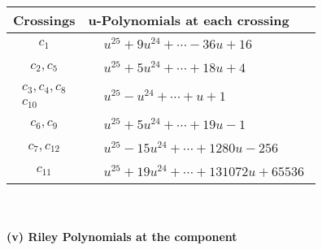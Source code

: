 \documentclass[1p]{elsarticle_modified}
\theoremstyle{definition}
\begin{document}
\begin{tabular}{m{50pt}|m{274pt}}
Crossings & \hspace{64pt}u-Polynomials at each crossing \\
\hline $$\begin{aligned}c_{1}\end{aligned}$$&$\begin{aligned}
&u^{25}+9 u^{24}+\cdots-36 u+16
\end{aligned}$\\
\hline $$\begin{aligned}c_{2},c_{5}\end{aligned}$$&$\begin{aligned}
&u^{25}+5 u^{24}+\cdots+18 u+4
\end{aligned}$\\
\hline $$\begin{aligned}c_{3},c_{4},c_{8}\\c_{10}\end{aligned}$$&$\begin{aligned}
&u^{25}- u^{24}+\cdots+u+1
\end{aligned}$\\
\hline $$\begin{aligned}c_{6},c_{9}\end{aligned}$$&$\begin{aligned}
&u^{25}+5 u^{24}+\cdots+19 u-1
\end{aligned}$\\
\hline $$\begin{aligned}c_{7},c_{12}\end{aligned}$$&$\begin{aligned}
&u^{25}-15 u^{24}+\cdots+1280 u-256
\end{aligned}$\\
\hline $$\begin{aligned}c_{11}\end{aligned}$$&$\begin{aligned}
&u^{25}+19 u^{24}+\cdots+131072 u+65536
\end{aligned}$\\
\hline
\end{tabular}\\~\\
\newpage\renewcommand{\arraystretch}{1}
\flushleft \textbf{(v) Riley Polynomials at the component}\newline \\
\end{document}
